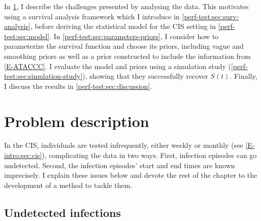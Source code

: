 \documentclass[thesis.tex]{subfiles}
\begin{document}
In \cref{perf-test:sec:problem}, I describe the challenges presented by analysing the data.
This motivates using a survival analysis framework which I introduce in \cref{perf-test:sec:surv-analysis}, before deriving the statistical model for the CIS setting in \cref{perf-test:sec:model}.
In \cref{perf-test:sec:parameters-priors}, I consider how to parameterize the survival function and choose its priors, including vague and smoothing priors as well as a prior constructed to include the information from \cref{E-ATACCC}.
I evaluate the model and priors using a simulation study (\cref{perf-test:sec:simulation-study}), showing that they successfully recover $S(t)$.
Finally, I discuss the results in \cref{perf-test:sec:discussion}.

\section{Problem description} \label{perf-test:sec:problem}

In the CIS, individuals are tested infrequently, either weekly or monthly (see \cref{E-intro:sec:cis}), complicating the data in two ways.
First, infection episodes can go undetected.
Second, the infection episodes' start and end times are known imprecisely.
I explain these issues below and devote the rest of the chapter to the development of a method to tackle  them.

\subsection{Undetected infections} \label{perf-test:sec:undetected}
\end{document}
